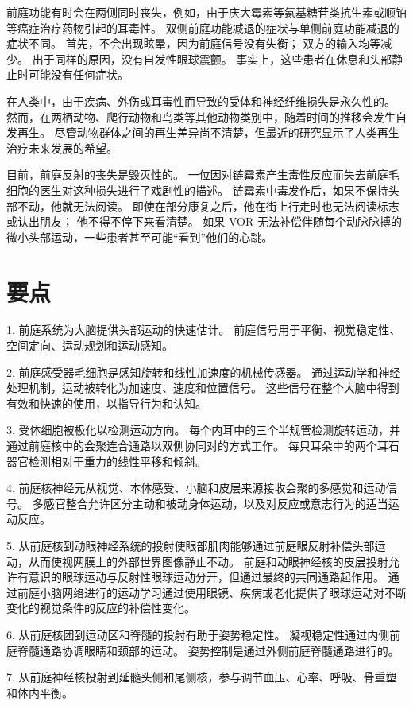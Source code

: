 前庭功能有时会在两侧同时丧失，例如，由于庆大霉素等氨基糖苷类抗生素或顺铂等癌症治疗药物引起的耳毒性。 双侧前庭功能减退的症状与单侧前庭功能减退的症状不同。 首先，不会出现眩晕，因为前庭信号没有失衡； 双方的输入均等减少。 出于同样的原因，没有自发性眼球震颤。 事实上，这些患者在休息和头部静止时可能没有任何症状。

在人类中，由于疾病、外伤或耳毒性而导致的受体和神经纤维损失是永久性的。 然而，在两栖动物、爬行动物和鸟类等其他动物类别中，随着时间的推移会发生自发再生。 尽管动物群体之间的再生差异尚不清楚，但最近的研究显示了人类再生治疗未来发展的希望。

目前，前庭反射的丧失是毁灭性的。 一位因对链霉素产生毒性反应而失去前庭毛细胞的医生对这种损失进行了戏剧性的描述。 链霉素中毒发作后，如果不保持头部不动，他就无法阅读。 即使在部分康复之后，他在街上行走时也无法阅读标志或认出朋友； 他不得不停下来看清楚。 如果 VOR 无法补偿伴随每个动脉脉搏的微小头部运动，一些患者甚至可能“看到”他们的心跳。

\section{要点}

1. 前庭系统为大脑提供头部运动的快速估计。 前庭信号用于平衡、视觉稳定性、空间定向、运动规划和运动感知。 

2. 前庭感受器毛细胞是感知旋转和线性加速度的机械传感器。 通过运动学和神经处理机制，运动被转化为加速度、速度和位置信号。 这些信号在整个大脑中得到有效和快速的使用，以指导行为和认知。 

3. 受体细胞被极化以检测运动方向。 每个内耳中的三个半规管检测旋转运动，并通过前庭核中的会聚连合通路以双侧协同对的方式工作。 每只耳朵中的两个耳石器官检测相对于重力的线性平移和倾斜。 

4. 前庭核神经元从视觉、本体感受、小脑和皮层来源接收会聚的多感觉和运动信号。 多感官整合允许区分主动和被动身体运动，以及对反应或意志行为的适当运动反应。 

5. 从前庭核到动眼神经系统的投射使眼部肌肉能够通过前庭眼反射补偿头部运动，从而使视网膜上的外部世界图像静止不动。 前庭和动眼神经核的皮层投射允许有意识的眼球运动与反射性眼球运动分开，但通过最终的共同通路起作用。 通过前庭小脑网络进行的运动学习通过使用眼镜、疾病或老化提供了眼球运动对不断变化的视觉条件的反应的补偿性变化。 

6. 从前庭核团到运动区和脊髓的投射有助于姿势稳定性。 凝视稳定性通过内侧前庭脊髓通路协调眼睛和颈部的运动。 姿势控制是通过外侧前庭脊髓通路进行的。 

7. 从前庭神经核投射到延髓头侧和尾侧核，参与调节血压、心率、呼吸、骨重塑和体内平衡。 

